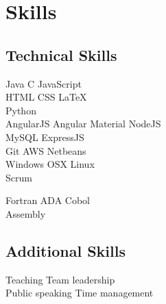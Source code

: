 \documentclass[letterpaper]{deedy-resume} %
\begin{document}
\begin{minipage}[t]{0.33\textwidth} %


\section{Skills}

\subsection{Technical Skills}

Java \textbullet{} C \textbullet{} JavaScript \\
HTML \textbullet{} CSS \textbullet{}  \LaTeX\ \\ 
Python\\ 
\sectionspace %
AngularJS \textbullet{} Angular Material \textbullet{} NodeJS\\
 MySQL\textbullet{} ExpressJS \\ 
\sectionspace %
Git \textbullet{} AWS \textbullet{} Netbeans\\
Windows \textbullet{} OSX \textbullet{} Linux \\
\sectionspace %
Scrum\\
\sectionspace %

Fortran\textbullet{} ADA \textbullet{}  Cobol \\ 
Assembly

\sectionspace %

\subsection{Additional Skills}
\sectionspace %
Teaching \textbullet{} Team leadership\\
Public speaking \textbullet{} Time management\\
\sectionspace %


\end{minipage}
\end{document}
